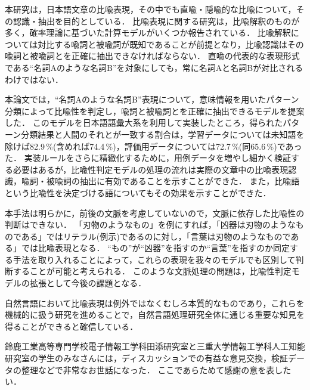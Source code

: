 本研究は，日本語文章の比喩表現，その中でも直喩・隠喩的な比喩について，その認識・抽出を目的としている．
比喩表現に関する研究は，比喩解釈のものが多く，確率理論に基づいた計算モデルがいくつか報告されている\cite{Iwayama-1,Pattabhiraman-1}．
比喩解釈については対比する喩詞と被喩詞が既知であることが前提となり，比喩認識はその喩詞と被喩詞とを正確に抽出できなければならない．
直喩の代表的な表現形式である``名詞Aのような名詞B''を対象にしても，常に名詞Aと名詞Bが対比されるわけではない．

本論文では，``名詞Aのような名詞B''表現について，意味情報を用いたパターン分類によって比喩性を判定し，喩詞と被喩詞とを正確に抽出できるモデルを提案した．
このモデルを日本語語彙大系を利用して実装したところ，得られたパターン分類結果と人間のそれとが一致する割合は，学習データについては未知語を除けば82.9\,\%(含めれば74.4\,\%)，評価用データについては72.7\,\%(同65.6\,\%)であった．
実装ルールをさらに精緻化するために，用例データを増やし細かく検証する必要はあるが，比喩性判定モデルの処理の流れは実際の文章中の比喩表現認識，喩詞・被喩詞の抽出に有効であることを示すことができた．
また，比喩語という比喩性を決定づける語についてもその効果を示すことができた．

本手法は明らかに，前後の文脈を考慮していないので，文脈に依存した比喩性の判断はできない．
「刃物のようなもの」を例にすれば，「凶器は刃物のようなものである」ではリテラル(例示)であるのに対し，「言葉は刃物のようなものである」では比喩表現となる．
``もの''が``凶器''を指すのか``言葉''を指すのか同定する手法を取り入れることによって，これらの表現を我々のモデルでも区別して判断することが可能と考えられる．
このような文脈処理の問題は，比喩性判定モデルの拡張として今後の課題となる．

自然言語において比喩表現は例外ではなくむしろ本質的なものであり\cite{Ikehara-2}，これらを機械的に扱う研究を進めることで，自然言語処理研究全体に通じる重要な知見を得ることができると確信している．

\acknowledgment

鈴鹿工業高等専門学校電子情報工学科田添研究室と三重大学情報工学科人工知能研究室の学生のみなさんには，ディスカッションでの有益な意見交換，検証データの整理などで非常なお世話になった．
ここであらためて感謝の意を表したい．




